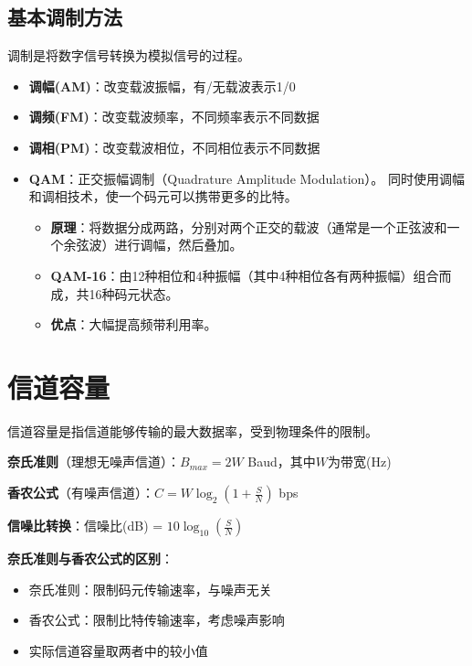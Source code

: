 \subsection{基本调制方法}
调制是将数字信号转换为模拟信号的过程。

\begin{itemize}[leftmargin=2em,itemsep=0pt]
    \item \textbf{调幅(AM)}：改变载波振幅，有/无载波表示1/0
    \item \textbf{调频(FM)}：改变载波频率，不同频率表示不同数据
    \item \textbf{调相(PM)}：改变载波相位，不同相位表示不同数据
    \item \textbf{QAM}：正交振幅调制（Quadrature Amplitude Modulation）。
    同时使用调幅和调相技术，使一个码元可以携带更多的比特。
    \begin{itemize}[itemsep=0pt]
        \item \textbf{原理}：将数据分成两路，分别对两个正交的载波（通常是一个正弦波和一个余弦波）进行调幅，然后叠加。
        \item \textbf{QAM-16}：由12种相位和4种振幅（其中4种相位各有两种振幅）组合而成，共16种码元状态。
        \item \textbf{优点}：大幅提高频带利用率。
    \end{itemize}
\end{itemize}

\section{信道容量}
信道容量是指信道能够传输的最大数据率，受到物理条件的限制。

\begin{formulabox}
\textbf{奈氏准则}（理想无噪声信道）：$B_{max} = 2W$ Baud，其中$W$为带宽(Hz)

\textbf{香农公式}（有噪声信道）：$C = W \log_2(1 + \frac{S}{N})$ bps

\textbf{信噪比转换}：信噪比(dB) = $10\log_{10}(\frac{S}{N})$
\end{formulabox}

\begin{notebox}
\textbf{奈氏准则与香农公式的区别}：
\begin{itemize}[itemsep=0pt]
    \item 奈氏准则：限制码元传输速率，与噪声无关
    \item 香农公式：限制比特传输速率，考虑噪声影响
    \item 实际信道容量取两者中的较小值
\end{itemize}
\end{notebox}

